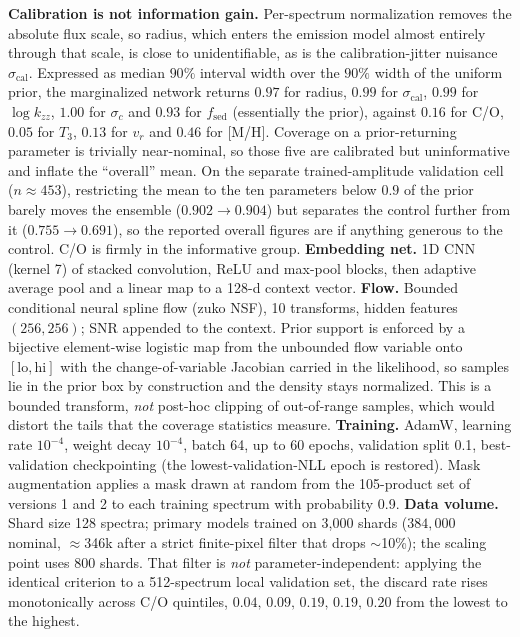\documentclass{article}
\begin{document}
\textbf{Calibration is not information gain.} Per-spectrum normalization removes
the absolute flux scale, so radius, which enters the emission model almost
entirely through that scale, is close to unidentifiable, as is the
calibration-jitter nuisance $\sigma_{\mathrm{cal}}$. Expressed as median $90\%$
interval width over the $90\%$ width of the uniform prior, the marginalized
network returns $0.97$ for radius, $0.99$ for $\sigma_{\mathrm{cal}}$, $0.99$
for $\log k_{zz}$, $1.00$ for $\sigma_c$ and $0.93$ for $f_{\mathrm{sed}}$
(essentially the prior), against $0.16$ for C/O, $0.05$ for $T_3$, $0.13$ for
$v_r$ and $0.46$ for [M/H]. Coverage on a prior-returning parameter is trivially
near-nominal, so those five are calibrated but uninformative and inflate the
``overall'' mean. On the separate trained-amplitude validation cell
($n\approx453$), restricting the mean to the ten parameters below $0.9$ of the
prior barely moves the ensemble ($0.902\to0.904$) but separates the control
further from it ($0.755\to0.691$), so the reported overall figures are if
anything generous to the control. C/O is firmly in the informative group.
\textbf{Embedding net.} 1D CNN (kernel 7) of stacked convolution, ReLU and
max-pool blocks, then adaptive average pool and a linear map to a 128-d context
vector.
\textbf{Flow.} Bounded conditional neural spline flow (zuko NSF), 10 transforms,
hidden features $(256,256)$; SNR appended to the context. Prior support is
enforced by a bijective element-wise logistic map from the unbounded flow
variable onto $[\mathrm{lo},\mathrm{hi}]$ with the change-of-variable Jacobian
carried in the likelihood, so samples lie in the prior box by construction and
the density stays normalized. This is a bounded transform, \emph{not} post-hoc
clipping of out-of-range samples, which would distort the tails that the coverage
statistics measure.
\textbf{Training.} AdamW, learning rate $10^{-4}$, weight decay $10^{-4}$, batch
64, up to 60 epochs, validation split 0.1, best-validation checkpointing (the
lowest-validation-NLL epoch is restored). Mask augmentation applies a mask drawn at
random from the 105-product set of versions 1 and 2 to each training spectrum
with probability 0.9.
\textbf{Data volume.} Shard size 128 spectra; primary models trained on 3{,}000
shards ($384{,}000$ nominal, $\approx$346k after a strict finite-pixel filter
that drops $\sim$10\%); the scaling point uses 800 shards. That filter is
\emph{not} parameter-independent: applying the identical criterion to a
512-spectrum local validation set, the discard rate rises monotonically across
C/O quintiles, $0.04,\,0.09,\,0.19,\,0.19,\,0.20$ from the lowest to the highest.
\end{document}
